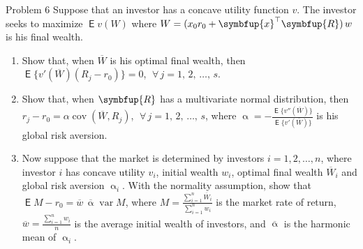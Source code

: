 \documentclass[10pt]{beamer}
\newcommand{\ds}{\displaystyle}
\newcommand{\vx}{\symbfup{x}}
\newcommand{\vR}{\symbfup{R}}
\DeclareMathOperator\expc{\mathsf{E}}
\DeclareMathOperator\var{var}
\DeclareMathOperator\cov{cov}
\theoremstyle{definition}
\begin{document}
\begin{frame}{Problem 6}
  Suppose that an investor has a concave utility function $v$. The investor seeks to maximize $\expc v(W)$ where $\ds W = (x_0 r_0 + \vx^\top\vR)\,w$ is his final wealth.
  \begin{enumerate}
    \item Show that, when $\overline{W}$ is his optimal final wealth, then $\ds\expc\big\{v'(\overline{W})(R_j - r_0)\big\} = 0$, $\;\forall\,j = 1,\,2,\,\ldots,\,s$.
    \item Show that, when $\vR$ has a multivariate normal distribution, then $\ds r_j - r_0 = \alpha\cov(\overline{W}, R_j)$, $\;\forall\,j = 1,\,2,\,\ldots,\,s$, where $\ds\upalpha = -\frac{\expc\big\{v''(\overline{W})\big\}}{\expc\big\{v'(\overline{W})\big\}}$ is his global risk aversion.
    \item Now suppose that the market is determined by investors $i = 1, 2, \ldots, n$, where investor $i$ has concave utility $v_i$, initial wealth $w_i$, optimal final wealth $\overline{W}_i$ and global risk aversion $\upalpha_i$. With the normality assumption, show that $\ds\expc M - r_0 = \overline{w}\,\overline{\upalpha}\var M$, where $\ds M = \frac{\sum_{i=1}^n\overline{W}_i}{\sum_{i=1}^n w_i}$ is the market rate of return, $\ds\overline{w} = \frac{\sum_{i=1}^n w_i}{n}$ is the average initial wealth of investors, and $\overline{\upalpha}$ is the harmonic mean of $\upalpha_i$.
  \end{enumerate}
\end{frame}
\end{document}
